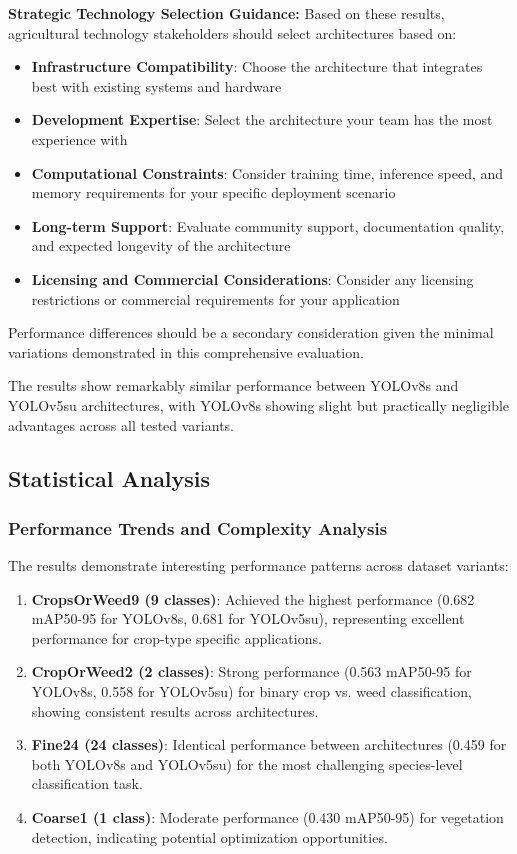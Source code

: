 \textbf{Strategic Technology Selection Guidance:} Based on these results, agricultural technology stakeholders should select architectures based on:
\begin{itemize}
    \item \textbf{Infrastructure Compatibility}: Choose the architecture that integrates best with existing systems and hardware
    \item \textbf{Development Expertise}: Select the architecture your team has the most experience with
    \item \textbf{Computational Constraints}: Consider training time, inference speed, and memory requirements for your specific deployment scenario
    \item \textbf{Long-term Support}: Evaluate community support, documentation quality, and expected longevity of the architecture
    \item \textbf{Licensing and Commercial Considerations}: Consider any licensing restrictions or commercial requirements for your application
\end{itemize}

Performance differences should be a secondary consideration given the minimal variations demonstrated in this comprehensive evaluation.

The results show remarkably similar performance between YOLOv8s and YOLOv5su architectures, with YOLOv8s showing slight but practically negligible advantages across all tested variants.

\subsection{Statistical Analysis}

\subsubsection{Performance Trends and Complexity Analysis}

The results demonstrate interesting performance patterns across dataset variants:

\begin{enumerate}
    \item \textbf{CropsOrWeed9 (9 classes)}: Achieved the highest performance (0.682 mAP50-95 for YOLOv8s, 0.681 for YOLOv5su), representing excellent performance for crop-type specific applications.
    
    \item \textbf{CropOrWeed2 (2 classes)}: Strong performance (0.563 mAP50-95 for YOLOv8s, 0.558 for YOLOv5su) for binary crop vs. weed classification, showing consistent results across architectures.
    
    \item \textbf{Fine24 (24 classes)}: Identical performance between architectures (0.459 for both YOLOv8s and YOLOv5su) for the most challenging species-level classification task.
    
    \item \textbf{Coarse1 (1 class)}: Moderate performance (0.430 mAP50-95) for vegetation detection, indicating potential optimization opportunities.
\end{enumerate}

